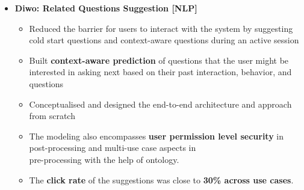 \documentclass[a4paper,10pt]{article}
\newcommand{\isep}{-2 pt}
\begin{document}
\begin{itemize}
\item \textbf{Diwo: Related Questions Suggestion [NLP]} 
    \\[-0.6cm]
    \begin{itemize}\itemsep \isep
    	\item Reduced the barrier for users to interact with the system by suggesting cold start questions and context-aware questions during an active session 
        \item Built \textbf{context-aware prediction} of questions that the user might be interested in asking next based on their past interaction, behavior, and questions
        \item Conceptualised and designed the end-to-end architecture and approach from scratch 
        \item The modeling also encompasses \textbf{user permission level security} in post-processing and multi-use case aspects in \\ pre-processing with the help of ontology. 
        \item The \textbf{click rate} of the suggestions was close to \textbf{30\% across use cases}.
        \\ [-0.5cm]
    \end{itemize}


\end{itemize}
\end{document}
